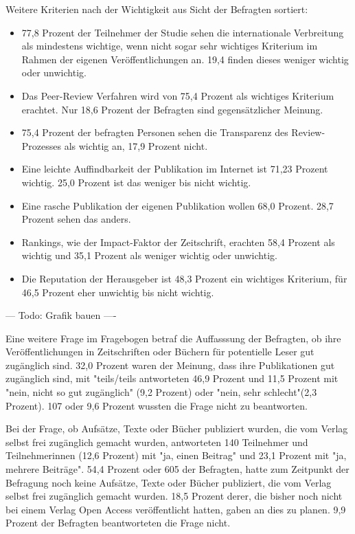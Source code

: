 Weitere Kriterien nach der Wichtigkeit aus Sicht der Befragten sortiert:
\begin{itemize}
\item 77,8 Prozent der Teilnehmer der Studie sehen die internationale Verbreitung als mindestens wichtige, wenn nicht sogar sehr wichtiges Kriterium im Rahmen der eigenen Veröffentlichungen an. 19,4 finden dieses weniger wichtig oder unwichtig.
\item Das Peer-Review Verfahren wird von 75,4 Prozent als wichtiges Kriterium erachtet. Nur 18,6 Prozent der Befragten sind gegensätzlicher Meinung.
\item 75,4 Prozent der befragten Personen sehen die Transparenz des Review-Prozesses als wichtig an, 17,9 Prozent nicht.
\item Eine leichte Auffindbarkeit der Publikation im Internet ist 71,23 Prozent wichtig. 25,0 Prozent ist das weniger bis nicht wichtig.
\item Eine rasche Publikation der eigenen Publikation wollen 68,0 Prozent. 28,7 Prozent sehen das anders.
\item Rankings, wie der Impact-Faktor der Zeitschrift, erachten 58,4 Prozent als wichtig und 35,1 Prozent als weniger wichtig oder unwichtig.
\item Die Reputation der Herausgeber ist 48,3 Prozent ein wichtiges Kriterium, für 46,5 Prozent eher unwichtig bis nicht wichtig.
\end{itemize}

--- Todo: Grafik bauen ----

Eine weitere Frage im Fragebogen betraf die Auffasssung der Befragten, ob ihre Veröffentlichungen in Zeitschriften oder Büchern für potentielle Leser gut zugänglich sind. 32,0 Prozent waren der Meinung, dass ihre Publikationen gut zugänglich sind, mit "teils/teils antworteten 46,9 Prozent und 11,5 Prozent mit "nein, nicht so gut zugänglich" (9,2 Prozent) oder "nein, sehr schlecht"(2,3 Prozent). 107 oder 9,6 Prozent wussten die Frage nicht zu beantworten.

Bei der Frage, ob Aufsätze, Texte oder Bücher publiziert wurden, die vom Verlag selbst frei zugänglich gemacht wurden, antworteten 140 Teilnehmer und Teilnehmerinnen (12,6 Prozent) mit "ja, einen Beitrag" und 23,1 Prozent mit "ja, mehrere Beiträge". 54,4 Prozent oder 605 der Befragten, hatte zum Zeitpunkt der Befragung noch keine Aufsätze, Texte oder Bücher publiziert, die vom Verlag selbst frei zugänglich gemacht wurden.  18,5 Prozent derer, die bisher noch nicht bei einem Verlag Open Access veröffentlicht hatten, gaben an dies zu planen. 9,9 Prozent der Befragten beantworteten die Frage nicht.

